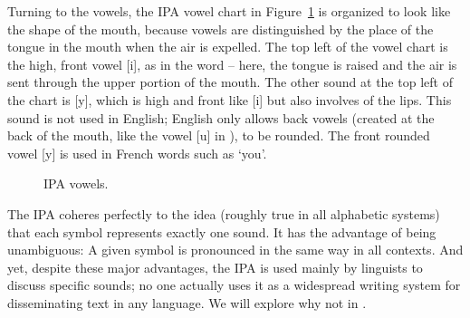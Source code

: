 Turning to the vowels, the IPA vowel chart in Figure~\ref{fig:ipa-vowels} is organized to look like the shape of the mouth, because vowels are distinguished by the place of the tongue in the mouth when the air is expelled.  The top left of the vowel chart is the high, front vowel [i], as in the word  -- here, the tongue is raised and the air is sent through the upper portion of the mouth.  The other sound at the top left of the chart is [y], which is high and front like [i] but also involves  of the lips.  This sound is not used in English; English only allows back vowels (created at the back of the mouth, like the vowel [u] in ), to be rounded.  The front rounded vowel [y] is used in French words such as  `you'.

\begin{figure}
\begin{vowel}
\end{vowel}
\caption{IPA vowels.}
\label{fig:ipa-vowels}
\end{figure}

The IPA coheres perfectly to the idea (roughly true in all alphabetic systems) that each symbol represents exactly one sound.  It has the advantage of being unambiguous: A given symbol is pronounced in the same way in all contexts.  And yet, despite these major advantages, the IPA is used mainly by linguists to discuss specific sounds; no one actually uses it as a widespread writing system for disseminating text in any language.  We will explore why not in .


